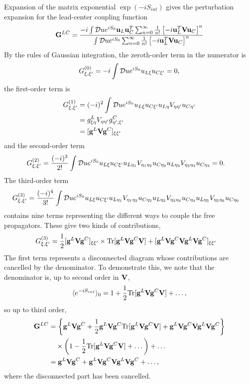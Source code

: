 Expansion of the matrix exponential $\exp(-iS_{int})$ gives the perturbation expansion for the lead-center coupling function
\begin{equation}
  \mathbf{G}^{LC} = \frac{-i \int \mathcal{D}u e^{iS_0} \mathbf{u}_{L}\mathbf{u}_{C}^T \sum_{n=0}^{\infty} \frac{1}{n!}\left[-i \mathbf{u}_{L}^T \mathbf{V} \mathbf{u}_{C} \right]^n}{\int \mathcal{D}u e^{iS_0} \sum_{n=0}^{\infty} \frac{1}{n!}\left[-i \mathbf{u}_{L}^T \mathbf{V} \mathbf{u}_{C} \right]^n}
\end{equation}
By the rules of Gaussian integration, the zeroth-order term in the numerator is 
\begin{equation}
 G^{(0)}_{\xi,\xi'} = -i \int \mathcal{D}u e^{iS_0} u_{L\xi}u_{C\xi'} = 0,
\end{equation}
the first-order term is
\begin{alignat}{2}
 G^{(1)}_{\xi,\xi'} &= (-i)^2 \int \mathcal{D}u e^{iS_0} u_{L\xi}u_{C\xi'} u_{L\eta} V_{\eta\eta'} u_{C\eta'} \\
  &= g^L_{\xi\eta} V_{\eta\eta'} g^C_{\eta',\xi'}\\
  &= [\mathbf{g}^L \mathbf{V} \mathbf{g}^C ]_{\xi\xi'}
\end{alignat}
and the second-order term
\begin{alignat}{2}
 G^{(2)}_{\xi,\xi'} &= \frac{(-i)^3}{2!} \int \mathcal{D}u e^{iS_0} u_{L\xi}u_{C\xi'} u_{L\eta_1} V_{\eta_1\eta_2} u_{C\eta_2} u_{L\eta_3} V_{\eta_3\eta_4} u_{C\eta_4}=0.
\end{alignat}
The third-order term
\begin{alignat}{2}
 G^{(3)}_{\xi,\xi'} &= \frac{(-i)^4}{3!} \int \mathcal{D}u e^{iS_0} u_{L\xi}u_{C\xi'} u_{L\eta_1} V_{\eta_1\eta_2} u_{C\eta_2} u_{L\eta_3} V_{\eta_3\eta_4} u_{C\eta_4}u_{L\eta_5} V_{\eta_5\eta_6} u_{C\eta_6}
\end{alignat}
contains nine terms representing the different ways to couple the free propagators. These give two kinds of contributions,
\begin{alignat}{2}
 G^{(3)}_{\xi,\xi'} &= \frac{1}{2} [\mathbf{g}^L \mathbf{V} \mathbf{g}^C ]_{\xi\xi'} \times \textrm{Tr}[\mathbf{g}^L \mathbf{V} \mathbf{g}^C \mathbf{V}]
  + [\mathbf{g}^L \mathbf{V} \mathbf{g}^C \mathbf{V} \mathbf{g}^L \mathbf{V} \mathbf{g}^C]_{\xi\xi'}
\end{alignat}
The first term represents a disconnected diagram whose contributions are cancelled by the denominator. To demonstrate this, we note that the denominator is, up to second order in $\mathbf{V}$,
\begin{equation}
 \langle e^{-iS_{int}} \rangle_0 = 1 + \frac{1}{2}   \textrm{Tr}[\mathbf{g}^L \mathbf{V} \mathbf{g}^C \mathbf{V}]+\dots,
\end{equation}
so up to third order,
\begin{alignat}{2}
 \mathbf{G}^{LC} &= \left\{\mathbf{g}^L \mathbf{V} \mathbf{g}^C + \frac{1}{2} \mathbf{g}^L \mathbf{V} \mathbf{g}^C \textrm{Tr}[\mathbf{g}^L \mathbf{V} \mathbf{g}^C \mathbf{V}]+\mathbf{g}^L \mathbf{V} \mathbf{g}^C \mathbf{V} \mathbf{g}^L \mathbf{V} \mathbf{g}^C\right\} \notag \\
  &\quad \times \left(1-\frac{1}{2}   \textrm{Tr}[\mathbf{g}^L \mathbf{V} \mathbf{g}^C \mathbf{V}] +\dots \right) +\dots \\
  &=\mathbf{g}^L \mathbf{V} \mathbf{g}^C+\mathbf{g}^L \mathbf{V} \mathbf{g}^C \mathbf{V} \mathbf{g}^L \mathbf{V} \mathbf{g}^C + \dots,
\end{alignat}
where the disconnected part has been cancelled. 

